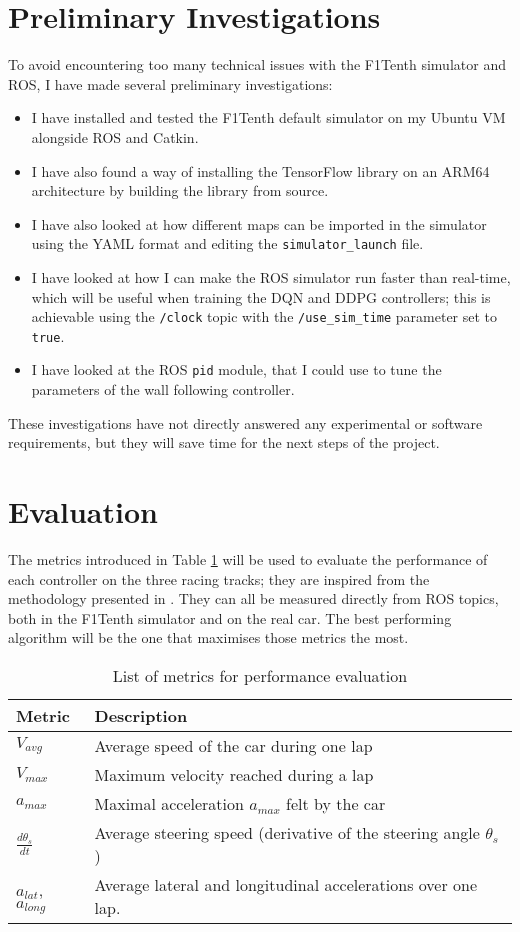 \section{Preliminary Investigations}
\label{preli}
To avoid encountering too many technical issues with the F1Tenth simulator and ROS, I have made several preliminary investigations: 
\begin{itemize}
	\item I have installed and tested the F1Tenth default simulator on my Ubuntu VM alongside ROS and Catkin.
	\item I have also found a way of installing the TensorFlow library on an ARM64 architecture by building the library from source. 
	\item I have also looked at how different maps can be imported in the simulator using the YAML format and editing the \verb |simulator_launch| file.
	\item I have looked at how I can make the ROS simulator run faster than real-time, which will be useful when training the DQN and DDPG controllers; this is achievable using the \verb |/clock| topic with the \verb |/use_sim_time| parameter set to \verb |true|.
	\item I have looked at the ROS \verb|pid| module, that I could use to tune the parameters of the wall following controller.
\end{itemize}


These investigations have not directly answered any experimental or software requirements, but they will save time for the next steps of the project.

\section{Evaluation}
\label{eva}

The metrics introduced in Table \ref{table:1} will be used to evaluate the performance of each controller on the three racing tracks; they are inspired from the methodology presented in \cite{benchmark}. They can all be measured directly from ROS topics, both in the F1Tenth simulator and on the real car. The best performing algorithm will be the one that maximises those metrics the most.

\begin{table}[H]
\centering
\begin{tabularx}{\textwidth}{||l X||}
 \hline
 Metric & Description\\ [0.5ex] 
 \hline\hline
 $V_{avg}$ & Average speed of the car during one lap \\ 
 $V_{max}$ & Maximum velocity reached during a lap \\
 ${a_{max}}$ & Maximal acceleration ${a_{max}}$ felt by the car \\
 $\frac{d\theta_s}{dt}$ & Average steering speed (derivative of the steering angle $\theta_s$) \\
 $a_{lat}$, $a_{long}$  & Average lateral and longitudinal accelerations over one lap. \\ [1ex] 
 \hline
\end{tabularx}
\caption{List of metrics for performance evaluation}
\label{table:1}
\end{table}


